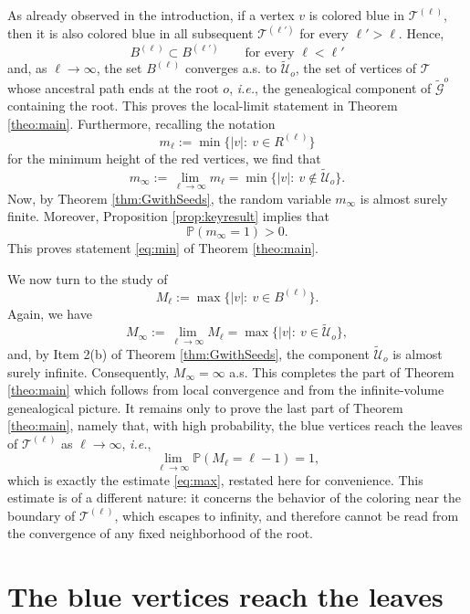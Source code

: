 \documentclass[french]{article}
\renewcommand{\P}{\mathbb{P}}
\newcommand{\T}{\mathcal{T}}
\renewcommand{\1}{\mathds{1}}
\begin{document}
As already observed in the introduction, if a vertex $v$ is colored blue in $\T^{(\ell)}$, then it is also colored blue in all subsequent $\T^{(\ell')}$ for every $\ell'>\ell$. Hence,
$$
B^{(\ell)}\subset B^{(\ell')} \qquad \text{for every $\ell<\ell'$}
$$
and, as $\ell \to \infty$, the set $B^{(\ell)}$ converges a.s. to $\tilde{\mathcal{U}}_o$, the set of vertices of $\T$ whose ancestral path ends at the root $o$, \emph{i.e.}, the genealogical component of $\tilde{\mathcal{G}}^{o}$ containing the root. This proves the local-limit statement in Theorem \ref{theo:main}. Furthermore, recalling the notation
$$
m_\ell:=\min\{|v|:\ v\in R^{(\ell)}\}
$$
for the minimum height of the red vertices, we find that
\begin{equation*}
m_\infty := \lim_{\ell \to \infty} m_{\ell}
=
\min\{|v|:\ v\notin \tilde{\mathcal{U}}_o\}.
\end{equation*}
Now, by Theorem \ref{thm:GwithSeeds}, the random variable $m_\infty$ is almost surely finite. Moreover, Proposition \ref{prop:keyresult} implies that
$$
\P(m_\infty=1)>0.
$$
This proves statement \eqref{eq:min} of Theorem \ref{theo:main}.
\medskip

We now turn to the study of
$$
M_\ell:=\max\{|v|:\ v\in B^{(\ell)}\}.
$$
Again, we have
$$
M_\infty := \lim_{\ell\to\infty} M_\ell = \max\{|v|:\ v\in \tilde{\mathcal{U}}_o\},
$$
and, by Item 2(b) of Theorem \ref{thm:GwithSeeds}, the component $\tilde{\mathcal{U}}_o$ is almost surely infinite. Consequently, $M_\infty=\infty$ a.s. This completes the part of Theorem \ref{theo:main} which follows from local convergence and from the infinite-volume genealogical picture.
It remains only to prove the last part of Theorem \ref{theo:main}, namely that, with high probability, the blue vertices reach the leaves of $\T^{(\ell)}$ as $\ell\to\infty$, \emph{i.e.},
\begin{equation}\label{eq:touchleaves}
\lim_{\ell\to\infty}\P(M_\ell=\ell-1)=1,
\end{equation}
which is exactly the estimate \eqref{eq:max}, restated here for convenience. This estimate is of a different nature: it concerns the behavior of the coloring near the boundary of $\T^{(\ell)}$, which escapes to infinity, and therefore cannot be read from the convergence of any fixed neighborhood of the root.


\section{The blue vertices reach the leaves}\label{sec:max}
\end{document}
